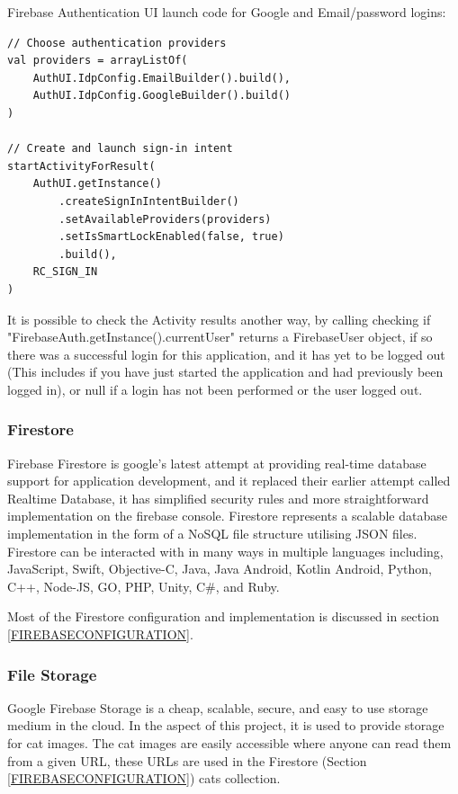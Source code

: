         Firebase Authentication UI launch code for Google and Email/password logins:
        \begin{verbatim}
// Choose authentication providers
val providers = arrayListOf(
    AuthUI.IdpConfig.EmailBuilder().build(),
    AuthUI.IdpConfig.GoogleBuilder().build()
)

// Create and launch sign-in intent
startActivityForResult(
    AuthUI.getInstance()
        .createSignInIntentBuilder()
        .setAvailableProviders(providers)
        .setIsSmartLockEnabled(false, true)
        .build(),
    RC_SIGN_IN
)
        \end{verbatim}
        
        It is possible to check the Activity results another way, by calling checking if \newline "FirebaseAuth.getInstance().currentUser" returns a FirebaseUser object, if so there was a successful login for this application, and it has yet to be logged out (This includes if you have just started the application and had previously been logged in), or null if a login has not been performed or the user logged out.

        \subsubsection{Firestore}
        Firebase Firestore is google's latest attempt at providing real-time database support for application development, and it replaced their earlier attempt called Realtime Database, it has simplified security rules and more straightforward implementation on the firebase console. Firestore represents a scalable database implementation in the form of a NoSQL file structure utilising JSON files. Firestore can be interacted with in many ways in multiple languages including, JavaScript, Swift, Objective-C, Java, Java Android, Kotlin Android, Python, C++, Node-JS, GO, PHP, Unity, C\#, and Ruby.
        
        Most of the Firestore configuration and implementation is discussed in section \ref{FIREBASECONFIGURATION}.
        
        \subsubsection{File Storage}
        Google Firebase Storage is a cheap, scalable, secure, and easy to use storage medium in the cloud. In the aspect of this project, it is used to provide storage for cat images. The cat images are easily accessible where anyone can read them from a given URL, these URLs are used in the Firestore (Section \ref{FIREBASECONFIGURATION}) cats collection. 
        
